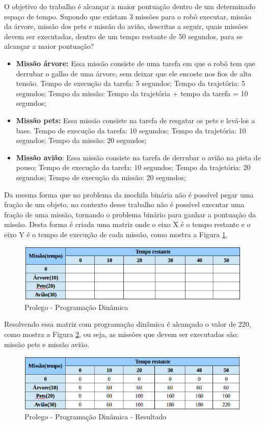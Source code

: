 O objetivo do trabalho é alcançar a maior pontuação dentro de um determinado espaço de tempo. Supondo que existam 3 missões para o robô executar, missão da árvore, missão dos pets e missão do avião, descritas a seguir, quais missões devem ser executadas, dentro de um tempo restante de 50 segundos, para se alcançar a maior pontuação?

\begin{itemize}
\item \textbf{Missão árvore:} Essa missão consiste de uma tarefa em que o robô tem que derrubar o galho de uma árvore, sem deixar que ele encoste nos fios de alta tensão. Tempo de execução da tarefa: 5 segundos; Tempo da trajetória: 5 segundos; Tempo da missão: Tempo da trajetória + tempo da tarefa = 10 segundos;
\item \textbf{Missão pets:} Essa missão consiste na tarefa de resgatar os pets e levá-los a base. Tempo de execução da tarefa: 10 segundos; Tempo da trajetória: 10 segundos; Tempo da missão: 20 segundos;
\item \textbf{Missão avião}: Essa missão consiste na tarefa de derrubar o avião na pista de pouso; Tempo de execução da tarefa: 10 segundos; Tempo da trajetória: 20 segundos; Tempo de execução da missão: 20 segundos;
\end{itemize}

Da mesma forma que no problema da mochila binária não é possível pegar uma fração de um objeto, no contexto desse trabalho não é possível executar uma fração de uma missão, tornando o problema binário para ganhar a pontuação da missão. Desta forma é criada uma matriz onde o eixo X é o tempo restante e o eixo Y é o tempo de execução de cada missão, como mostra a Figura \ref{matrizProlego}.

\FloatBarrier
\begin{figure}[!h]
\centering
\includegraphics[keepaspectratio=true,scale=0.6]{figuras/matrizProlego.png}
\caption{Prolego - Programação Dinâmica}
\label{matrizProlego}
\end{figure}


Resolvendo essa matriz com programação dinâmica é alcançado o valor de 220, como mostra a Figura \ref{matrizProlegoResult}, ou seja, as missões que devem ser executadas são: missão pets e missão avião.  

\FloatBarrier
\begin{figure}[!h]
\centering
\includegraphics[keepaspectratio=true,scale=0.6]{figuras/matrizProlegoResult.png}
\caption{Prolego - Programação Dinâmica - Resultado}
\label{matrizProlegoResult}
\end{figure}


